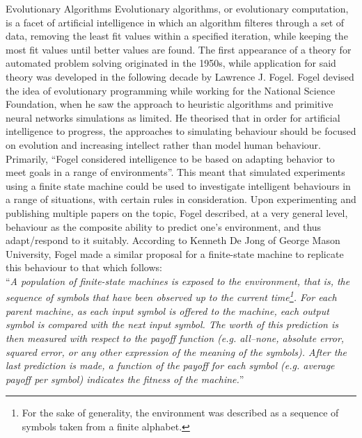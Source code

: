 \documentclass[12pt,a4paper]{article}
\makeatletter
\renewcommand\subsection{\@startsection {subsection}{1}{2mm}
                               {3pt plus 2pt minus 1pt}
                               {3pt plus 0pt}
                               {\normalfont\bfseries}}
\makeatother
\begin{document}
\subsection{Evolutionary Algorithms}
Evolutionary algorithms, or evolutionary computation, is a facet of artificial intelligence in which an algorithm filteres through a set of data, removing the least fit values within a specified iteration, while keeping the most fit values until better values are found. The first appearance of a theory for automated problem solving originated in the 1950s, while application for said theory was developed in the following decade by Lawrence J. Fogel. Fogel devised the idea of evolutionary programming while working for the National Science Foundation, when he saw the approach to heuristic algorithms and primitive neural networks simulations as limited. He theorised that in order for artificial intelligence to progress, the approaches to simulating behaviour should be focused on evolution and increasing intellect rather than model human behaviour. Primarily, “Fogel considered intelligence to be based on adapting behavior to meet goals in a range of environments”\cite[p.~92]{49}. This meant that simulated experiments using a finite state machine could be used to investigate intelligent behaviours in a range of situations, with certain rules in consideration. Upon experimenting and publishing multiple papers on the topic, Fogel described, at a very general level, behaviour as the composite ability to predict one's environment, and thus adapt/respond to it suitably. According to Kenneth De Jong of George Mason University, Fogel made a similar proposal for a finite-state machine to replicate this behaviour to that which follows: \\

\noindent
“\textit{A population of finite-state machines is exposed to the environment, that is, the sequence of symbols that have been observed up to the current time\footnote{For the sake of generality, the environment was described as a sequence of symbols taken from a finite alphabet.}. For each parent machine, as each input symbol is offered to the machine, each output symbol is compared with the next input symbol. The worth of this prediction is then measured with respect to the payoff function (e.g. all–none, absolute error, squared error, or any other expression of the meaning of the symbols). After the last prediction is made, a function of the payoff for each symbol (e.g. average payoff per symbol) indicates the fitness of the machine.}”\cite[p.~92]{49} \\
\end{document}
